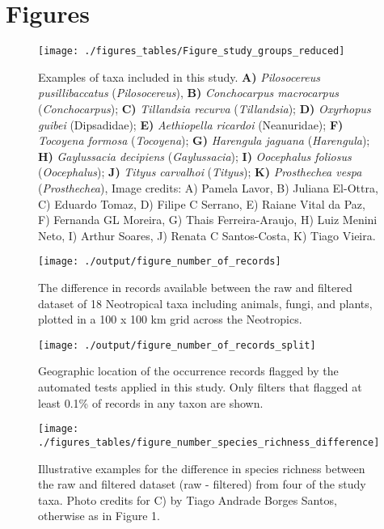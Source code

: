 \documentclass[fleqn,10pt,lineno]{wlpeerj} %
\begin{document}
\hypertarget{figures}{%
\section*{Figures}\label{figures}}

\begin{figure}
\texttt{[image: ./figures\_tables/Figure\_study\_groups\_reduced]} \caption{Examples of taxa included in this study. \textbf{A)} \textit{Pilosocereus pusillibaccatus} (\textit{Pilosocereus}), \textbf{B)} \textit{Conchocarpus macrocarpus} (\textit{Conchocarpus}); \textbf{C)} \textit{Tillandsia recurva} (\textit{Tillandsia}); \textbf{D)} \textit{Oxyrhopus guibei} (Dipsadidae); \textbf{E)} \textit{Aethiopella ricardoi} (Neanuridae); \textbf{F)} \textit{Tocoyena formosa} (\textit{Tocoyena}); \textbf{G)} \textit{Harengula jaguana} (\textit{Harengula}); \textbf{H)} \textit{Gaylussacia decipiens} (\textit{Gaylussacia}); \textbf{I)} \textit{Oocephalus foliosus} (\textit{Oocephalus}); \textbf{J)} \textit{Tityus carvalhoi} (\textit{Tityus}); \textbf{K)} \textit{Prosthechea vespa} (\textit{Prosthechea}), Image credits: A) Pamela Lavor, B) Juliana El-Ottra, C) Eduardo Tomaz, D) Filipe C Serrano, E) Raiane Vital da Paz, F) Fernanda GL Moreira, G) Thais Ferreira-Araujo, H) Luiz Menini Neto, I) Arthur Soares, J) Renata C Santos-Costa, K) Tiago Vieira.}\label{fig:species}
\end{figure}

\begin{figure}
\texttt{[image: ./output/figure\_number\_of\_records]} \caption{The difference in records available between the raw and filtered dataset of 18 Neotropical taxa including animals, fungi, and plants, plotted in a 100 x 100 km grid across the Neotropics.}\label{fig:total}
\end{figure}

\begin{figure}
\texttt{[image: ./output/figure\_number\_of\_records\_split]} \caption{Geographic location of the occurrence records flagged by the automated tests applied in this study. Only filters that flagged at least 0.1\% of records in any taxon are shown.}\label{fig:split}
\end{figure}

\begin{figure}
\texttt{[image: ./figures\_tables/figure\_number\_species\_richness\_difference]} \caption{Illustrative examples for the difference in species richness between the raw and filtered dataset (raw - filtered) from four of the study taxa. Photo credits for C) by Tiago Andrade Borges Santos, otherwise as in Figure 1.}\label{fig:speciesrichness}
\end{figure}
\end{document}
